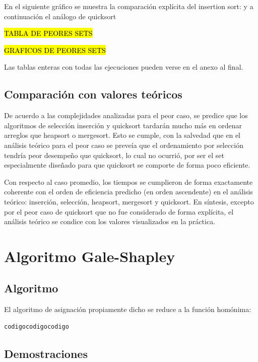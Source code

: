 \documentclass[article,a4paper]{article}
\begin{document}
En el siguiente gráfico se muestra la comparación explícita del insertion sort:
y a continuación el análogo de quicksort

\hl{TABLA DE PEORES SETS}

\hl{GRAFICOS DE PEORES SETS}

Las tablas enteras con todas las ejecuciones pueden verse en el anexo al final.


\subsection{Comparación con valores teóricos}

De acuerdo a las complejidades analizadas para el peor caso, se predice que los algoritmos de selección inserción y quicksort tardarán mucho más en ordenar arreglos que heapsort o mergesort. Esto se cumple, con la salvedad que en el análisis teórico para el peor caso se preveía que el ordenamiento por selección tendría peor desempeño que quicksort, lo cual no ocurrió, por ser el set especialmente diseñado para que quicksort se comporte de forma poco eficiente.

Con respecto al caso promedio, los tiempos se cumplieron de forma exactamente coherente con el orden de eficiencia predicho (en orden ascendente) en el análisis teórico: inserción, selección, heapsort, mergesort y quicksort. En síntesis, excepto por el peor caso de quicksort que no fue considerado de forma explícita, el análisis teórico se condice con los valores visualizados en la práctica.


\section{Algoritmo Gale-Shapley}

\subsection{Algoritmo}

El algoritmo de asignación propiamente dicho se reduce a la función homónima:

\begin{verbatim}
codigocodigocodigo
\end{verbatim}

\subsection{Demostraciones}
\end{document}

